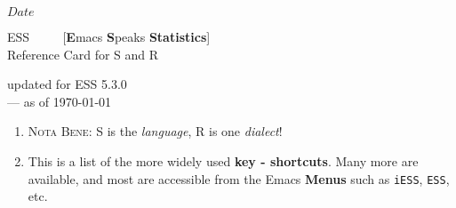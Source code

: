 \documentclass[a4paper]{article}
\begin{document}
\SVN $Date$
\begin{center}
  {\LARGE ESS \ \ \ \ {\large
      [\textbf{E}macs \textbf{S}peaks \textbf{Statistics}]}
      \\[.5ex] Reference Card for S and R}

  \smallskip

  {\small updated for ESS 5.3.0}%
  \\[1ex] {\tiny \SVNDate}
           \footnotesize --- as of \today
\end{center}
\begin{enumerate}
\item  \textsc{Nota Bene:} S is the \emph{language},
  R is one \emph{dialect}!
\item This is a list of the more widely used \textbf{key - shortcuts}.
  Many more are available, and most are accessible from the Emacs
  \textbf{Menus} such as \texttt{iESS}, \texttt{ESS}, etc.
\end{enumerate}
\end{document}

